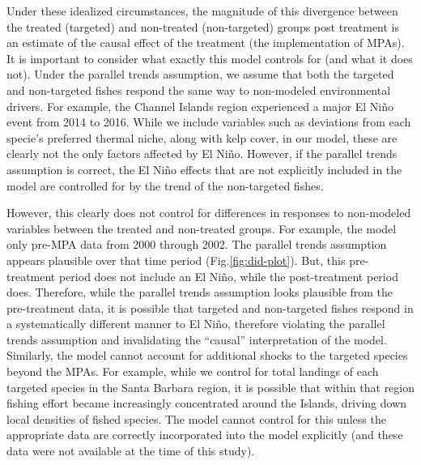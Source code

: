 \documentclass[twoside,12pt,final]{ucthesis-CA2012}
\begin{document}
\begin{ucmainmatter}
Under these idealized circumstances, the magnitude of this divergence
between the treated (targeted) and non-treated (non-targeted) groups
post treatment is an estimate of the causal effect of the treatment (the
implementation of MPAs). It is important to consider what exactly this
model controls for (and what it does not). Under the parallel trends
assumption, we assume that both the targeted and non-targeted fishes
respond the same way to non-modeled environmental drivers. For example,
the Channel Islands region experienced a major El Niño event from 2014
to 2016. While we include variables such as deviations from each
specie's preferred thermal niche, along with kelp cover, in our model,
these are clearly not the only factors affected by El Niño. However, if
the parallel trends assumption is correct, the El Niño effects that are
not explicitly included in the model are controlled for by the trend of
the non-targeted fishes.

However, this clearly does not control for differences in responses to
non-modeled variables between the treated and non-treated groups. For
example, the model only pre-MPA data from 2000 through 2002. The
parallel trends assumption appears plausible over that time period
(Fig.\ref{fig:did-plot}). But, this pre-treatment period does not
include an El Niño, while the post-treatment period does. Therefore,
while the parallel trends assumption looks plausible from the
pre-treatment data, it is possible that targeted and non-targeted fishes
respond in a systematically different manner to El Niño, therefore
violating the parallel trends assumption and invalidating the ``causal''
interpretation of the model. Similarly, the model cannot account for
additional shocks to the targeted species beyond the MPAs. For example,
while we control for total landings of each targeted species in the
Santa Barbara region, it is possible that within that region fishing
effort became increasingly concentrated around the Islands, driving down
local densities of fished species. The model cannot control for this
unless the appropriate data are correctly incorporated into the model
explicitly (and these data were not available at the time of this
study).


\end{ucmainmatter}
\end{document}
